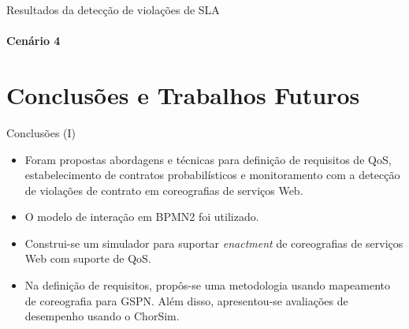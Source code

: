 \documentclass[xcolor=svgnames]{beamer}
\begin{document}
  \begin{frame}{Resultados da detecção de violações de SLA }  
	\framesubtitle{Cenário \textbf{4}}    
    \end{frame}
    


\section{Conclusões e Trabalhos Futuros}
  \begin{frame}{Conclusões (I)}
      \begin{itemize}
	\item Foram propostas  abordagens e técnicas para definição de requisitos de QoS, estabelecimento de contratos probabilísticos
	e monitoramento com a detecção de violações de contrato em coreografias de serviços Web.
	\item O modelo de interação em BPMN2 foi utilizado.
	\item Construi-se um simulador para suportar \textit{enactment} de coreografias de serviços Web com suporte de QoS.
	\item Na definição de requisitos, propôs-se uma metodologia usando mapeamento de coreografia para GSPN. Além disso, 
	apresentou-se avaliações de desempenho usando o ChorSim.
      \end{itemize}

  \end{frame}
\end{document}

